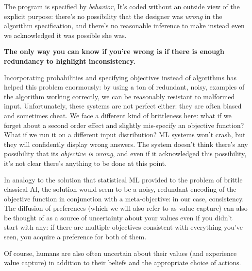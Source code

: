 \documentclass{article}
\begin{document}
	The program is specified by \emph{behavior},  It's coded without an outside view of the explicit purpose: there's no possibility that the designer was \textit{wrong} in the algorithm specification, and there's no reasonable inference to make instead even we acknowledged it was possible she was.
	
	\textbf{The only way you can know if you're wrong is if there is enough redundancy to highlight inconsistency.}
	
	Incorporating probabilities and specifying objectives instead of algorithms has helped this problem enormously: by using a ton of redundant, noisy, examples of the algorithm working correctly, we can be reasonably resistant to malformed input. Unfortunately, these systems are not perfect either: they are often biased and sometimes cheat. We face a different kind of brittleness here: what if we forget about a second order effect and slightly mis-specify an objective function? What if we run it on a different input distribution? ML systems won't crash, but they will confidently display  wrong answers. The system doesn't think there's any possibility that its \textit{objective is wrong}, and even if it acknowledged this possibility, it's not clear there's anything to be done at this point.
	
	{\color{green!30!black}In analogy to the solution that statistical ML provided to the problem of brittle classical AI, the solution would seem to be a noisy, redundant encoding of the objective function in conjunction with a meta-objective: in our case, consistency. The diffusion of preferences (which we will also refer to as value capture) can also be thought of as a source of uncertainty about your values even if you didn't start with any: if there are multiple objectives consistent with everything you've seen, you acquire a preference for both of them.}
	
	Of course, humans are also often uncertain about their values (and experience value capture) in addition to their beliefs and the appropriate choice of actions.
	
	
	
	
\end{document}
